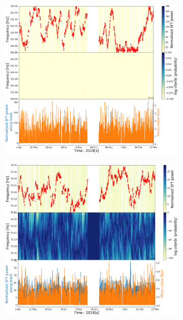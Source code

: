 \begin{figure}[hpt]
	\begin{subfigure}[h]{0.49\textwidth}
		\includegraphics[width=\textwidth]{C6_detchar/track_F101_85_101_95.png}
		\caption{\label{detchar:soap:unknown:3}}
	\end{subfigure}
	\begin{subfigure}[h]{0.49\textwidth}
		\includegraphics[width=\textwidth]{C6_detchar/track_F70_15_70_25.png}
		\caption{\label{detchar:soap:unknown:4}}
	\end{subfigure}

\end{figure}
